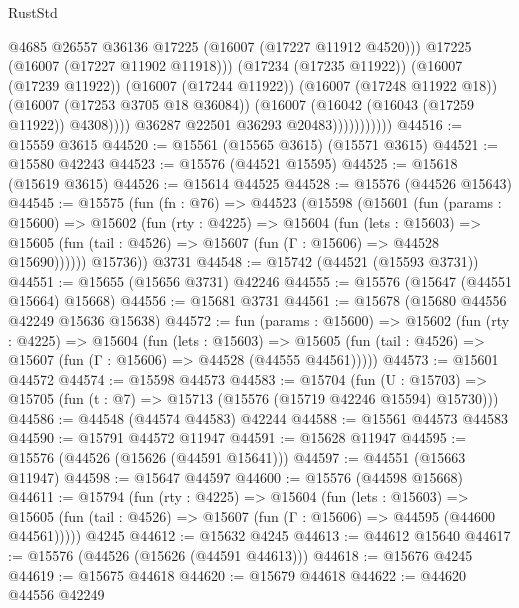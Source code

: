 \begin{lexlean}{RustStd}
\begin{coremodule}
                                  @4685
                                  @26557
                                  @36136
                                  @17225
                                  (@16007 (@17227 @11912 @4520)))
                                @17225
                                (@16007 (@17227 @11902 @11918)))
                              (@17234 (@17235 @11922))
                              (@16007 (@17239 @11922))
                              (@16007 (@17244 @11922))
                              (@16007 (@17248 @11922 @18))
                              (@16007 (@17253 @3705 @18 @36084))
                              (@16007 (@16042 (@16043 (@17259 @11922)) @4308))))
                          @36287
                          @22501
                          @36293
                          @20483)))))))))))
@44516 := @15559 @3615
@44520 := @15561 (@15565 @3615) (@15571 @3615)
@44521 := @15580 @42243
@44523 := @15576 (@44521 @15595)
@44525 := @15618 (@15619 @3615)
@44526 := @15614 @44525
@44528 := @15576 (@44526 @15643)
@44545 := @15575
    (fun (fn : @76) =>
    @44523
      (@15598
        (@15601
          (fun (params : @15600) =>
          @15602
            (fun (rty : @4225) =>
            @15604
              (fun (lets : @15603) =>
              @15605 (fun (tail : @4526) => @15607 (fun (Γ : @15606) => @44528 @15690))))))
        @15736))
    @3731
@44548 := @15742 (@44521 (@15593 @3731))
@44551 := @15655 (@15656 @3731) @42246
@44555 := @15576 (@15647 (@44551 @15664) @15668)
@44556 := @15681 @3731
@44561 := @15678 (@15680 @44556 @42249 @15636 @15638)
@44572 := fun (params : @15600) =>
  @15602
    (fun (rty : @4225) =>
    @15604
      (fun (lets : @15603) =>
      @15605 (fun (tail : @4526) => @15607 (fun (Γ : @15606) => @44528 (@44555 @44561)))))
@44573 := @15601 @44572
@44574 := @15598 @44573
@44583 := @15704
    (fun (U : @15703) => @15705 (fun (t : @7) => @15713 (@15576 (@15719 @42246 @15594) @15730)))
@44586 := @44548 (@44574 @44583) @42244
@44588 := @15561 @44573 @44583
@44590 := @15791 @44572 @11947
@44591 := @15628 @11947
@44595 := @15576 (@44526 (@15626 (@44591 @15641)))
@44597 := @44551 (@15663 @11947)
@44598 := @15647 @44597
@44600 := @15576 (@44598 @15668)
@44611 := @15794
    (fun (rty : @4225) =>
    @15604
      (fun (lets : @15603) =>
      @15605 (fun (tail : @4526) => @15607 (fun (Γ : @15606) => @44595 (@44600 @44561)))))
    @4245
@44612 := @15632 @4245
@44613 := @44612 @15640
@44617 := @15576 (@44526 (@15626 (@44591 @44613)))
@44618 := @15676 @4245
@44619 := @15675 @44618
@44620 := @15679 @44618
@44622 := @44620 @44556 @42249

\end{coremodule}
\end{lexlean}
